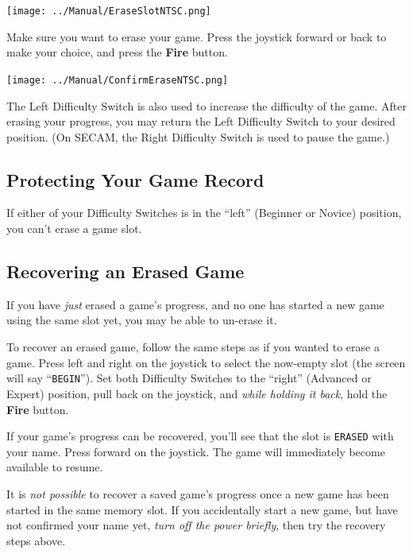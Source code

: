 \documentclass[10pt,twocolumn,openany,article]{memoir}
\begin{document}
\begin{center}
  \texttt{[image: ../Manual/EraseSlotNTSC.png]}
\end{center}

Make sure  you want to  erase your game.  Press the joystick  forward or
back to make your choice, and press the \textbf{Fire} button.

\begin{center}
  \texttt{[image: ../Manual/ConfirmEraseNTSC.png]}
\end{center}

The Left  Difficulty Switch is also  used to increase the  difficulty of
the  game.  After  erasing  your  progress,  you  may  return  the  Left
Difficulty  Switch  to  your  desired position.  (On  SECAM,  the  Right
Difficulty Switch is used to pause the game.)

\subsection{Protecting Your Game Record}

If either  of your Difficulty Switches  is in the ``left''  (Beginner or
Novice) position, you can't erase a game slot.

\subsection{Recovering an Erased Game}

If you have \emph{just} erased a game's progress, and no one has started
a new game using the same slot yet, you may be able to un-erase it.

To recover  an erased game,  follow the same steps  as if you  wanted to
erase  a game.  Press  left and  right  on the  joystick  to select  the
now-empty  slot  (the  screen  will say  ``\texttt{BEGIN}'').  Set  both
Difficulty Switches to the ``right'' (Advanced or Expert) position, pull
back  on  the joystick,  and  \emph{while  holding  it back},  hold  the
\textbf{Fire} button.

If your  game's progress can be  recovered, you'll see that  the slot is
\texttt{ERASED} with your name. Press  forward on the joystick. The game
will immediately become available to resume.

It is \emph{not possible} to recover  a saved game's progress once a new
game has been started in the same memory slot. If you accidentally start
a new  game, but have  not confirmed your  name yet, \emph{turn  off the
  power briefly}, then try the recovery steps above.
\end{document}
